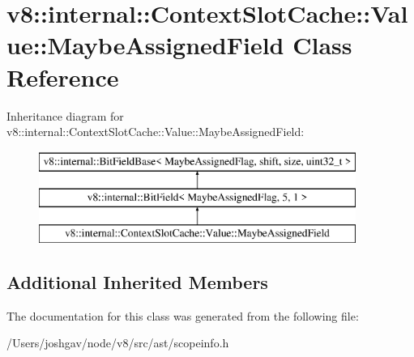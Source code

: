 \hypertarget{classv8_1_1internal_1_1_context_slot_cache_1_1_value_1_1_maybe_assigned_field}{}\section{v8\+:\+:internal\+:\+:Context\+Slot\+Cache\+:\+:Value\+:\+:Maybe\+Assigned\+Field Class Reference}
\label{classv8_1_1internal_1_1_context_slot_cache_1_1_value_1_1_maybe_assigned_field}
Inheritance diagram for v8\+:\+:internal\+:\+:Context\+Slot\+Cache\+:\+:Value\+:\+:Maybe\+Assigned\+Field\+:\begin{figure}[H]
\begin{center}
\leavevmode
\includegraphics[height=3.000000cm]{classv8_1_1internal_1_1_context_slot_cache_1_1_value_1_1_maybe_assigned_field}
\end{center}
\end{figure}
\subsection*{Additional Inherited Members}


The documentation for this class was generated from the following file\+:\begin{DoxyCompactItemize}
\item 
/\+Users/joshgav/node/v8/src/ast/scopeinfo.\+h\end{DoxyCompactItemize}
